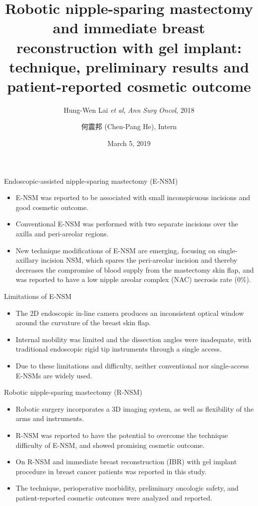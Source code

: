 \documentclass{beamer}
\title[(Lai \textit{et al}, 2018)]{
    Robotic nipple-sparing mastectomy and immediate breast reconstruction with
    gel implant: technique, preliminary results and patient-reported cosmetic
    outcome
}
\subtitle{Hung-Wen Lai \textit{et al}, \textit{Ann Surg Oncol}, 2018}
\author[Chen-Pang He]{何震邦 (Chen-Pang He), Intern}
\date{March 5, 2019}
\institute[CGH]{Cathay General Hospital}
\begin{document}
\maketitle

\begin{frame}{Endoscopic-assisted nipple-sparing mastectomy (E-NSM)}
    \begin{itemize}
        \item E-NSM was reported to be associated with small inconspicuous
              incisions and good cosmetic outcome.
        \item Conventional E-NSM was performed with two separate incisions over
              the axilla and peri-areolar regions.
        \item New technique modifications of E-NSM are emerging, focusing on
              single-axillary incision NSM, which spares the peri-areolar
              incision and thereby decreases the compromise of blood supply
              from the mastectomy skin flap, and was reported to have a low
              nipple areolar complex (NAC) necrosis rate (0\%).
    \end{itemize}
\end{frame}

\begin{frame}{Limitations of E-NSM}
    \begin{itemize}
        \item The 2D endoscopic in-line camera produces an inconsistent optical
              window around the curvature of the breast skin flap.
        \item Internal mobility was limited and the dissection angles were
              inadequate, with traditional endoscopic rigid tip instruments
              through a single access.
        \item Due to these limitations and difficulty, neither conventional nor
              single-access E-NSMs are widely used.
    \end{itemize}
\end{frame}

\begin{frame}{Robotic nipple-sparing mastectomy (R-NSM)}
    \begin{itemize}
        \item Robotic surgery incorporates a 3D imaging system, as well as
              flexibility of the arms and instruments.
        \item R-NSM was reported to have the potential to overcome the
              technique difficulty of E-NSM, and showed promising cosmetic
              outcome.
        \item On R-NSM and immediate breast reconstruction (IBR) with gel
              implant procedure in breast cancer patients was reported in this
              study.
        \item The technique, perioperative morbidity, preliminary oncologic
              safety, and patient-reported cosmetic outcomes were analyzed and
              reported.
    \end{itemize}
\end{frame}
\end{document}
